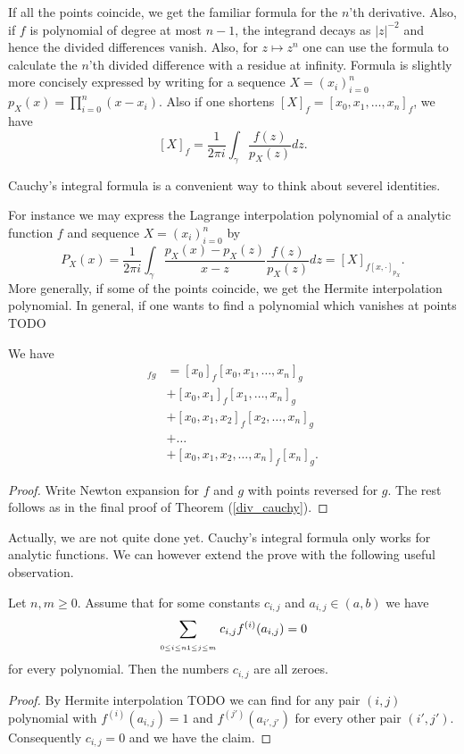 If all the points coincide, we get the familiar formula for the $n$'th derivative. Also, if $f$ is polynomial of degree at most $n - 1$, the integrand decays as $|z|^{-2}$ and hence the divided differences vanish. Also, for $z \mapsto z^{n}$ one can use the formula to calculate the $n$'th divided difference with a residue at infinity. Formula is slightly more concisely expressed by writing for a sequence $X = (x_{i})_{i = 0}^{n}$ $p_{X}(x) = \prod_{i = 0}^{n} (x - x_{i})$. Also if one shortens $[X]_{f} = [x_{0}, x_{1}, \ldots, x_{n}]_{f}$, we have
\[
	[X]_{f} = \frac{1}{2 \pi i} \int_{\gamma} \frac{f(z)}{p_{X}(z)} dz.
\]

Cauchy's integral formula is a convenient way to think about severel identities.

\begin{esim}
For instance we may express the Lagrange interpolation polynomial of a analytic function $f$ and sequence $X = (x_{i})_{i = 0}^{n}$ by
\[
	P_{X}(x) = \frac{1}{2 \pi i} \int_{\gamma} \frac{p_{X}(x) - p_{X}(z)}{x - z}\frac{f(z)}{p_{X}(z)} dz = [X]_{f [x, \cdot]_{p_{X}}}.
\]
More generally, if some of the points coincide, we get the Hermite interpolation polynomial. In general, if one wants to find a polynomial which vanishes at points TODO
\end{esim}


\begin{prop}\label{Leibniz_rule}
	We have
	\begin{align*}
		[x_{0}, x_{1}, \ldots, x_{n}]_{f g} &= [x_{0}]_{f} [x_{0}, x_{1}, \ldots, x_{n}]_{g} \\
		&+ [x_{0}, x_{1}]_{f} [x_{1}, \ldots, x_{n}]_{g} \\
		&+ [x_{0}, x_{1}, x_{2}]_{f} [x_{2}, \ldots, x_{n}]_{g} \\
		&+ \ldots \\
		&+ [x_{0}, x_{1}, x_{2}, \ldots, x_{n}]_{f} [x_{n}]_{g}.
	\end{align*}
\end{prop}
\begin{proof}
	Write Newton expansion for $f$ and $g$ with points reversed for $g$. The rest follows as in the final proof of Theorem (\ref{div_cauchy}).
\end{proof}

Actually, we are not quite done yet. Cauchy's integral formula only works for analytic functions. We can however extend the prove with the following useful observation.
\begin{lem}\label{bootstrap_lemma}
	Let $n, m \geq 0$. Assume that for some constants $c_{i, j}$ and $a_{i, j} \in (a, b)$ we have
	\begin{align*}
	\sum_{\atop{0 \leq i \leq n}{1 \leq j \leq m}} c_{i, j} f^{(i)}(a_{i, j}) = 0
	\end{align*}
	for every polynomial. Then the numbers $c_{i, j}$ are all zeroes.
\end{lem}
\begin{proof}
	By Hermite interpolation TODO we can find for any pair $(i, j)$ polynomial with $f^{(i)}(a_{i, j}) = 1$ and $f^{(j')}(a_{i', j'})$ for every other pair $(i', j')$. Consequently $c_{i, j} = 0$ and we have the claim.
\end{proof}

